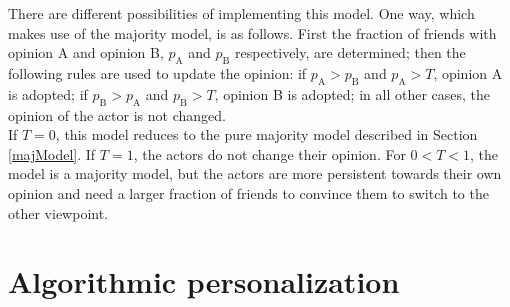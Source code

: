 \documentclass[11 pt , letterpaper , twoside , openright]{book}
\begin{document}
\newline
There are different possibilities of implementing this model. One way, which makes use of the majority model, is as follows. First the fraction of friends with opinion A and opinion B, $p_\text{A}$ and $p_\text{B}$ respectively, are determined; then the following rules are used to update the opinion: if $p_\text{A} > p_\text{B}$ and $p_\text{A} > T$, opinion A is adopted; if $p_\text{B} > p_\text{A}$ and $p_\text{B} > T$, opinion B is adopted; in all other cases, the opinion of the actor is not changed.\\
\newline
If $T = 0$, this model reduces to the pure majority model described in Section \ref{majModel}. If $T = 1$, the actors do not change their opinion. For $0 < T < 1$, the model is a majority model, but the actors are more persistent towards their own opinion and need a larger fraction of friends to convince them to switch to the other viewpoint.

\section{Algorithmic personalization}\label{filter}
\end{document}
